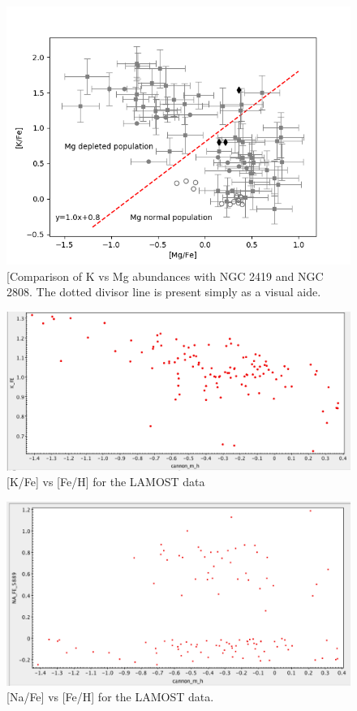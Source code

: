 \documentclass[a4paper,fleqn,usenatbib]{mnras}
\begin{document}
\begin{figure}
	\includegraphics[width=\columnwidth]{KvsMgab.png}
    \caption{[Comparison of K vs Mg abundances with NGC 2419 and NGC 2808. The dotted divisor line is present simply as a visual aide.}
    \label{KvsMg}
\end{figure}

\begin{figure}
	\includegraphics[width=\columnwidth]{KvsFe.png}
    \caption{[K/Fe] vs [Fe/H] for the LAMOST data}
    \label{KvsFe}
\end{figure}

\begin{figure}
	\includegraphics[width=\columnwidth]{NavsFe.png}
    \caption{[Na/Fe] vs [Fe/H] for the LAMOST data.}
    \label{NavsFe}
\end{figure}
\end{document}
